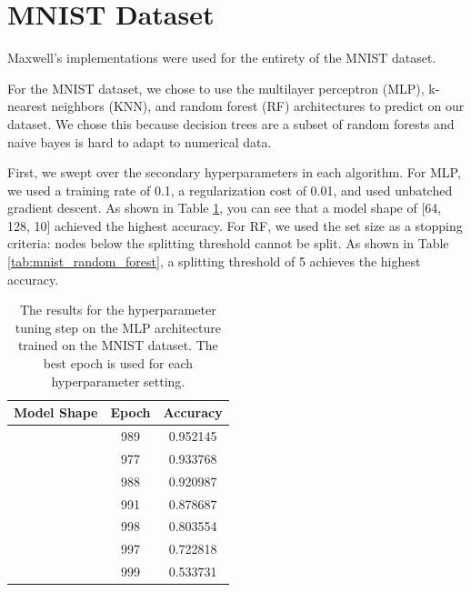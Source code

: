\section{MNIST Dataset}
Maxwell's implementations were used for the entirety of the MNIST dataset.

For the MNIST dataset, we chose to use the multilayer perceptron (MLP), k-nearest neighbors (KNN), and
random forest (RF) architectures to predict on our dataset.
We chose this because decision trees are a subset of random forests and naive bayes is hard to adapt
to numerical data.

First, we swept over the secondary hyperparameters in each algorithm.
For MLP, we used a training rate of 0.1, a regularization cost of 0.01, and used unbatched gradient
descent.
As shown in Table \ref{tab:mnist_nn}, you can see that a model shape of [64, 128, 10] achieved the
highest accuracy.
For RF, we used the set size as a stopping criteria: nodes below the splitting threshold cannot be
split.
As shown in Table \ref{tab:mnist_random_forest}, a splitting threshold of 5 achieves the highest
accuracy.

\begin{table}
    \centering
    \begin{tabular}{c|c|c}
        Model Shape      & Epoch & Accuracy \\
        \hline
        [64, 128, 10]    & 989   & 0.952145 \\ \relax
        [64, 64, 10]     & 977   & 0.933768 \\ \relax
        [64, 10]         & 988   & 0.920987 \\ \relax
        [64, 16, 10]     & 991   & 0.878687 \\ \relax
        [64, 16, 16, 10] & 998   & 0.803554 \\ \relax
        [64, 8, 10]      & 997   & 0.722818 \\ \relax
        [64, 8, 8, 10]   & 999   & 0.533731
    \end{tabular}
    \caption{The results for the hyperparameter tuning step on the MLP architecture trained on the
             MNIST dataset.
             The best epoch is used for each hyperparameter setting.}
    \label{tab:mnist_nn}
\end{table}

